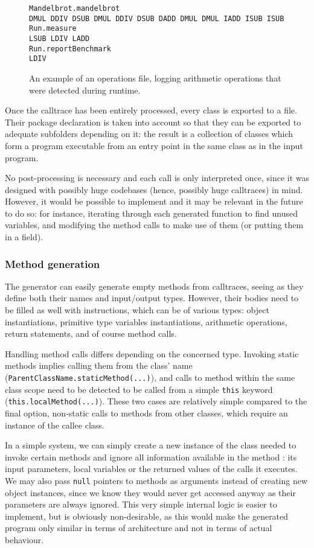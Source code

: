 \documentclass[12pt]{article}
\begin{document}
\begin{figure}[h!]
\begin{verbatim}
Mandelbrot.mandelbrot
DMUL DDIV DSUB DMUL DDIV DSUB DADD DMUL DMUL IADD ISUB ISUB 
Run.measure
LSUB LDIV LADD
Run.reportBenchmark
LDIV
\end{verbatim}
\captionsetup{justification=centering}
\caption{An example of an operations file, logging arithmetic operations that were detected during runtime.}
\label{fig:operations_file}
\end{figure}

Once the calltrace has been entirely processed, every class is exported to a file. Their package declaration is taken into account so that they can be exported to adequate subfolders depending on it: the result is a collection of classes which form a program executable from an entry point in the same class as in the input program.

No post-processing is necessary and each call is only interpreted once, since it was designed with possibly huge codebases (hence, possibly huge calltraces) in mind. However, it would be possible to implement and it may be relevant in the future to do so: for instance, iterating through each generated function to find unused variables, and modifying the method calls to make use of them (or putting them in a field).

\subsubsection{Method generation}
The generator can easily generate empty methods from calltraces, seeing as they define both their names and input/output types. However, their bodies need to be filled as well with instructions, which can be of various types: object instantiations, primitive type variables instantiations, arithmetic operations, return statements, and of course method calls. 

\bigskip
Handling method calls differs depending on the concerned type. Invoking static methods implies calling them from the class' name 
(\texttt{ParentClassName\-.staticMethod(...)}), and calls to method within the same class scope need to be detected to be called from a simple \texttt{this} keyword (\texttt{this.\-localMethod(...)}). These two cases are relatively simple compared to the final option, non-static calls to methods from other classes, which require an instance of the callee class.

In a simple system, we can simply create a new instance of the class needed to invoke certain methods and ignore all information available in the method : its input parameters, local variables or the returned values of the calls it executes. We may also pass \texttt{null} pointers to methods as arguments instead of creating new object instances, since we know they would never get accessed anyway as their parameters are always ignored. This very simple internal logic is easier to implement, but is obviously non-desirable, as this would make the generated program only similar in terms of architecture and not in terms of actual behaviour.
 
\end{document}
